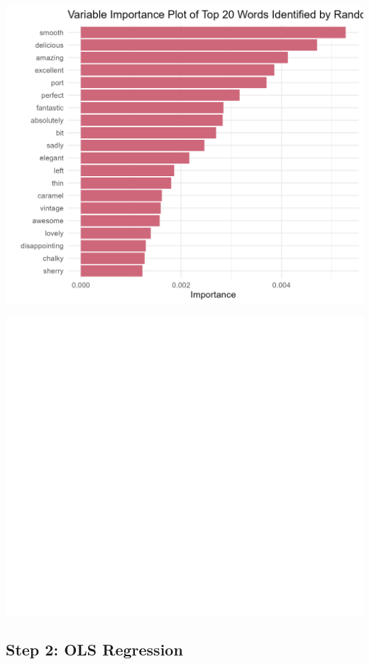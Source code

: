 \documentclass[11pt,preprint]{elsarticle}
\let\origfigure\figure
\let\endorigfigure\endfigure
\renewenvironment{figure}[1][2] {
    \expandafter\origfigure\expandafter[H]
} {
    \endorigfigure
}
\numberwithin{equation}{section}
\numberwithin{figure}{section}
\numberwithin{table}{section}
\begin{document}
\begin{figure}[H]

{\centering \includegraphics[width=0.8\linewidth]{writeup/fig5} 

}

\caption{Variable Importance Plot of Top 20 Words in Reviews Identified by Random Forest Model}\label{fig:fig5}
\end{figure}
\begin{figure}[H]

{\centering \includegraphics[width=0.8\linewidth]{writeup/fig6} 

}

\caption{Word cloud of top 50 words in reviews identified by Random Forest model}\label{fig:fig6}
\end{figure}

\subsection{Step 2: OLS Regression}\label{step-2-ols-regression}
\end{document}
